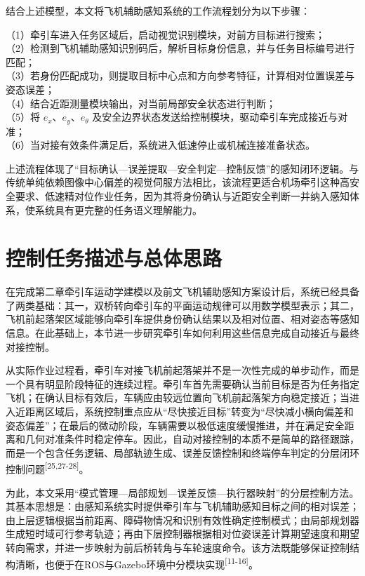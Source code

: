 结合上述模型，本文将飞机辅助感知系统的工作流程划分为以下步骤：

（1）牵引车进入任务区域后，启动视觉识别模块，对前方目标进行搜索；\\
（2）检测到飞机辅助感知识别码后，解析目标身份信息，并与任务目标编号进行匹配；\\
（3）若身份匹配成功，则提取目标中心点和方向参考特征，计算相对位置误差与姿态误差；\\
（4）结合近距测量模块输出，对当前局部安全状态进行判断；\\
（5）将 \(e_{x}\)、\(e_{y}\)、\(e_{\theta}\)
及安全边界状态发送给控制模块，驱动牵引车完成接近与对准；\\
（6）当对接有效条件满足后，系统进入低速停止或机械连接准备状态。

上述流程体现了``目标确认---误差提取---安全判定---控制反馈''的感知闭环逻辑。与传统单纯依赖图像中心偏差的视觉伺服方法相比，该流程更适合机场牵引这种高安全要求、低速精对位作业任务，因为其将身份确认与近距安全判断一并纳入感知体系，使系统具有更完整的任务语义理解能力。

\section{控制任务描述与总体思路}

在完成第二章牵引车运动学建模以及前文飞机辅助感知方案设计后，系统已经具备了两类基础：其一，双桥转向牵引车的平面运动规律可以用数学模型表示；其二，飞机前起落架区域能够向牵引车提供身份确认结果以及相对位置、相对姿态等感知信息。在此基础上，本节进一步研究牵引车如何利用这些信息完成自动接近与最终对接控制。

从实际作业过程看，牵引车对接飞机前起落架并不是一次性完成的单步动作，而是一个具有明显阶段特征的连续过程。牵引车首先需要确认当前目标是否为任务指定飞机；在确认目标有效后，车辆应由较远位置向飞机前起落架方向稳定接近；当进入近距离区域后，系统控制重点应从``尽快接近目标''转变为``尽快减小横向偏差和姿态偏差''；在最后的微动阶段，车辆需要以极低速度缓慢推进，并在满足安全距离和几何对准条件时稳定停车。因此，自动对接控制的本质不是简单的路径跟踪，而是一个包含任务逻辑、局部轨迹生成、误差反馈控制和终端停车判定的分层闭环控制问题\textsuperscript{[25,27-28]}。

为此，本文采用``模式管理---局部规划---误差反馈---执行器映射''的分层控制方法。其基本思想是：由感知系统实时提供牵引车与飞机辅助感知目标之间的相对误差；由上层逻辑根据当前距离、障碍物情况和识别有效性确定控制模式；由局部规划器生成短时域可行参考轨迹；再由下层控制器根据相对位姿误差计算期望速度和期望转向需求，并进一步映射为前后桥转角与车轮速度命令。该方法既能够保证控制结构清晰，也便于在ROS与Gazebo环境中分模块实现\textsuperscript{[11-16]}。

